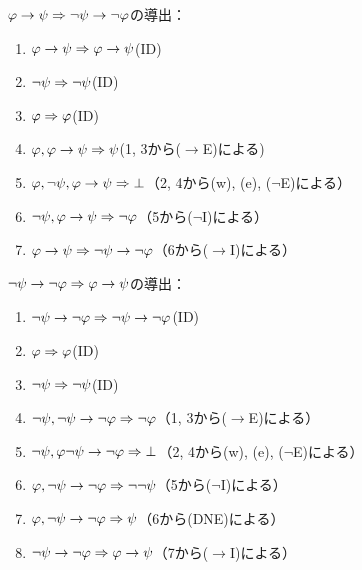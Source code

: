 \(\varphi \to \psi \Rightarrow \lnot \psi \to \lnot \varphi\)の導出：
\begin{enumerate}
	\item \(\varphi \to \psi \Rightarrow \varphi \to \psi\)\quad (ID)
	\item \(\lnot \psi \Rightarrow \lnot \psi\)\quad (ID)
	\item \(\varphi \Rightarrow \varphi\)\quad (ID)
	\item \(\varphi, \varphi \to \psi \Rightarrow \psi\)\quad (1, 3から(\(\to\)E)による)
	\item \(\varphi, \lnot \psi, \varphi \to \psi \Rightarrow \bot\)\quad （2, 4から(w), (e), (\(\lnot\)E)による）
	\item \(\lnot \psi, \varphi \to \psi \Rightarrow \lnot \varphi\)\quad （5から(\(\lnot\)I)による）
	\item \(\varphi \to \psi \Rightarrow \lnot \psi \to \lnot \varphi\)\quad （6から(\(\to\)I)による）
\end{enumerate}

\(\lnot \psi \to \lnot \varphi \Rightarrow \varphi \to \psi\)の導出：
\begin{enumerate}
	\item \(\lnot \psi \to \lnot \varphi \Rightarrow \lnot \psi \to \lnot \varphi\)\quad (ID)
	\item \(\varphi \Rightarrow \varphi\)\quad (ID)
	\item \(\lnot \psi \Rightarrow \lnot \psi\)\quad (ID)
	\item \(\lnot \psi, \lnot \psi \to \lnot \varphi \Rightarrow \lnot \varphi\)\quad （1, 3から(\(\to\)E)による）
	\item \(\lnot \psi, \varphi \lnot \psi \to \lnot \varphi \Rightarrow \bot\)\quad （2, 4から(w), (e), (\(\lnot\)E)による）
	\item \(\varphi, \lnot \psi \to \lnot\varphi \Rightarrow \lnot \lnot \psi\)\quad （5から(\(\lnot\)I)による）
	\item \(\varphi, \lnot \psi \to \lnot \varphi \Rightarrow \psi\)\quad （6から(DNE)による）
	\item \(\lnot \psi \to \lnot \varphi \Rightarrow \varphi \to \psi\)\quad （7から(\(\to\)I)による）
\end{enumerate}

